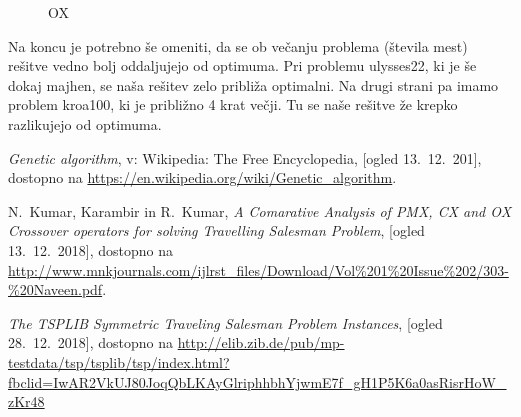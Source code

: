 \documentclass[12pt,a4paper]{amsart}
\theoremstyle{definition} %
\theoremstyle{plain} %
\begin{document}
\begin{figure}[h!]
\begin{minipage}[t]{0.48\textwidth}
\caption{OX}
\label{OX}
\end{minipage}
\end{figure}


Na koncu je potrebno še omeniti, da se ob večanju problema (števila mest) rešitve vedno bolj oddaljujejo od optimuma. Pri problemu ulysses22, ki je še dokaj majhen, se naša rešitev zelo približa optimalni. Na drugi strani pa imamo problem kroa100, ki je približno 4 krat večji. Tu se naše rešitve že krepko razlikujejo od optimuma. 


\newpage
\begin{thebibliography}{}


\emph{Genetic algorithm}, v: Wikipedia: The Free Encyclopedia, [ogled 13.~12.~201], dostopno na \url{https://en.wikipedia.org/wiki/Genetic_algorithm}.

N.~Kumar, Karambir in R.~Kumar, \emph{A Comarative Analysis of PMX, CX and OX Crossover operators for solving Travelling Salesman Problem}, [ogled 13.~12.~2018], dostopno na \url{http://www.mnkjournals.com/ijlrst_files/Download/Vol%201%20Issue%202/303-%20Naveen.pdf}.


 \emph{ The TSPLIB Symmetric Traveling Salesman Problem Instances}, [ogled 28.~12.~2018], dostopno na \url{http://elib.zib.de/pub/mp-testdata/tsp/tsplib/tsp/index.html?fbclid=IwAR2VkUJ80JoqQbLKAyGlriphhbhYjwmE7f_gH1P5K6a0asRisrHoW_zKr48}




\end{thebibliography}{}
\end{document}
